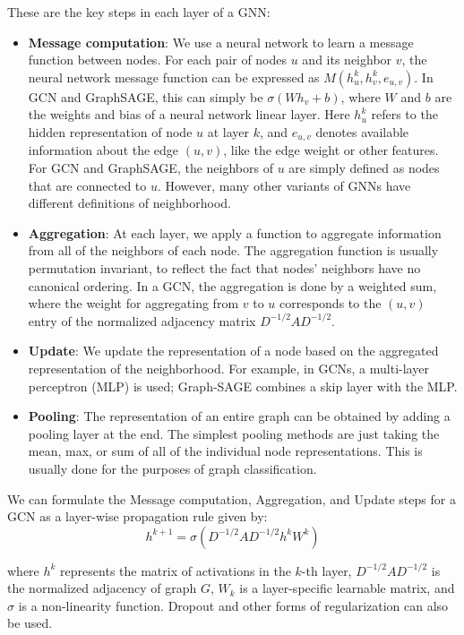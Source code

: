 These are the key steps in each layer of a GNN:
\begin{itemize}
    \item \textbf{Message computation}: We use a neural network to learn a message function between nodes. For each pair of nodes $u$ and its neighbor $v$, the neural network message function can be expressed as $M(h^k_u,h^k_v,e_{u,v})$. In GCN and GraphSAGE, this can simply be $\sigma(W h_v + b)$, where $W$ and $b$ are the weights and bias of a neural network linear layer. Here $h^k_u$ refers to the hidden representation of node $u$ at layer $k$, and $e_{u,v}$ denotes available information about the edge $(u, v)$, like the edge weight or other features. For GCN and GraphSAGE, the neighbors of $u$ are simply defined as nodes that are connected to $u$. However, many other variants of GNNs have different definitions of neighborhood.
    \item \textbf{Aggregation}: At each layer, we apply a function to aggregate information from all of the neighbors of each node. The aggregation function is usually permutation invariant, to reflect the fact that nodes’ neighbors have no canonical ordering. In a GCN, the aggregation is done by a weighted sum, where the weight for aggregating from $v$ to $u$ corresponds to the $(u,v)$ entry of the normalized adjacency matrix $D^{-1/2}AD^{-1/2}$.
    \item \textbf{Update}: We update the representation of a node based on the aggregated representation of the neighborhood. For example, in GCNs, a multi-layer perceptron (MLP) is used; Graph-SAGE combines a skip layer with the MLP.
    \item \textbf{Pooling}: The representation of an entire graph can be obtained by adding a pooling layer at the end. The simplest pooling methods are just taking the mean, max, or sum of all of the individual node representations. This is usually done for the purposes of graph classification.
\end{itemize}

We can formulate the Message computation, Aggregation, and Update steps for a GCN as a layer-wise propagation rule given by:
\begin{equation}
    h^{k+1} = \sigma(D^{-1/2} A D^{-1/2} h^k W^k)
\end{equation}

where $h^k$ represents the matrix of activations in the $k$-th layer, $D^{-1/2}AD^{-1/2}$ is the normalized adjacency of graph $G$, $W_k$ is a layer-specific learnable matrix, and $\sigma$ is a non-linearity function. Dropout and other forms of regularization can also be used.

